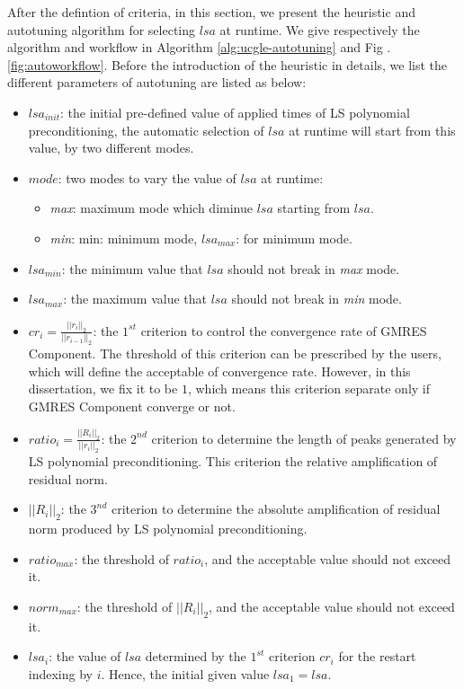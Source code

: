 After the defintion of criteria, in this section, we present the heuristic and autotuning algorithm for selecting $lsa$ at runtime. We give respectively the algorithm and workflow in Algorithm \ref{alg:ucgle-autotuning} and Fig .\ref{fig:autoworkflow}. Before the introduction of the heuristic in details, we list the different parameters of autotuning are listed as below:

\begin{itemize}
	\item $lsa_{init}$: the initial pre-defined value of applied times of LS polynomial preconditioning, the automatic selection of $lsa$ at runtime will start from this value, by two different modes.
	\item $mode$: two modes to vary the value of $lsa$ at runtime:
	\begin{itemize}
		\item \textit{max}:  maximum mode which diminue $lsa$ starting from $lsa$.
		\item \textit{min}: min: minimum mode, $lsa_{max}$: for minimum mode.
	\end{itemize}
	\item $lsa_{min}$: the minimum value that $lsa$ should not break in \textit{max} mode.
	\item $lsa_{max}$: the maximum value that $lsa$ should not break in \textit{min} mode.
	\item $cr_i = \frac{||r_i||_2}{||r_{i-1}||_2}$: the $1^{st}$ criterion to control the convergence rate of GMRES Component. The threshold of this criterion can be prescribed by the users, which will define the acceptable of convergence rate. However, in this dissertation, we fix it to be $1$, which means this criterion separate only if GMRES Component converge or not.
	\item $ratio_i=\frac{||R_i||_2}{||r_{i}||_2}$: the $2^{nd}$ criterion to determine the length of peaks generated by LS polynomial preconditioning. This criterion the relative amplification of residual norm.
	\item $||R_i||_2$: the $3^{nd}$ criterion to determine the absolute amplification of residual norm produced by LS polynomial preconditioning.
	\item $ratio_{max}$: the threshold of $ratio_i$, and the acceptable value should not exceed it.  
	\item $norm_{max}$: the threshold of $||R_i||_2$, and the acceptable value should not exceed it. 
	\item $lsa_i$: the value of $lsa$ determined by the $1^{st}$ criterion $cr_i$ for the restart indexing by $i$. Hence, the initial given value $lsa_1 = lsa$.

\end{itemize}
